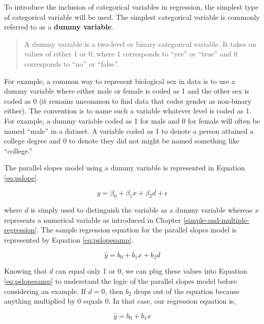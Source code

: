 \documentclass[
]{book}
\begin{document}
To introduce the inclusion of categorical variables in regression, the simplest type of categorical variable will be used. The simplest categorical variable is commonly referred to as a \textbf{dummy variable}.

\begin{quote}
A dummy variable is a two-level or binary categorical variable. It takes on values of either 1 or 0, where 1 corresponds to ``yes'' or ``true'' and 0 corresponds to ``no'' or ``false''.
\end{quote}

For example, a common way to represent biological sex in data is to use a dummy variable where either male or female is coded as 1 and the other sex is coded as 0 (it remains uncommon to find data that codes gender as non-binary either). The convention is to name such a variable whatever level is coded as 1. For example, a dummy variable coded as 1 for male and 0 for female will often be named ``male'' in a dataset. A variable coded as 1 to denote a person attained a college degree and 0 to denote they did not might be named something like ``college.''

The parallel slopes model using a dummy variable is represented in Equation \eqref{eq:pslope}.

\begin{equation}
y = \beta_0 + \beta_1x + \beta_2d + \epsilon
\label{eq:pslope}
\end{equation}

where \(d\) is simply used to distinguish the variable as a dummy variable whereas \(x\) represents a numerical variable as introduced in Chapter \ref{simple-and-multiple-regression}. The sample regression equation for the parallel slopes model is represented by Equation \eqref{eq:pslopesamp}.

\begin{equation}
\hat{y} = b_0 + b_1x + b_2d
\label{eq:pslopesamp}
\end{equation}

Knowing that \(d\) can equal only 1 or 0, we can plug these values into Equation \eqref{eq:pslopesamp} to understand the logic of the parallel slopes model before considering an example. If \(d=0\), then \(b_2\) drops out of the equation because anything multiplied by 0 equals 0. In that case, our regression equation is,

\begin{equation}
\hat{y} = b_0 + b_1x
\label{eq:pslopesamp0}
\end{equation}
\end{document}
